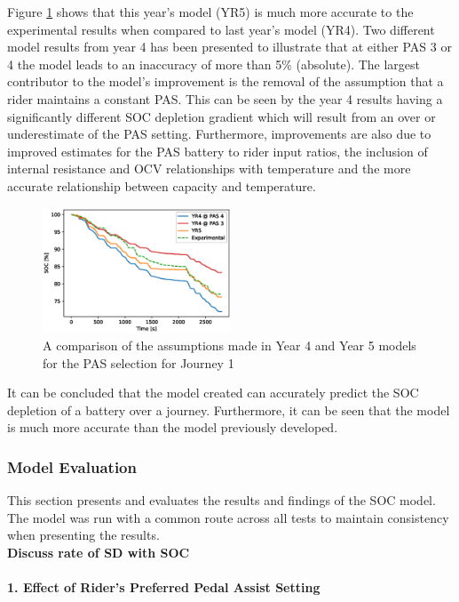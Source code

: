 \documentclass[a4paper, 10pt]{article}
\numberwithin{equation}{section}
\begin{document}
Figure \ref{fig:val_yr4_pas} shows that this year's model (YR5) is much more accurate to the experimental results when compared to last year's model (YR4). Two different model results from year 4 has been presented to illustrate that at either PAS 3 or 4 the model leads to an inaccuracy of more than 5\% (absolute). The largest contributor to the model's improvement is the removal of the assumption that a rider maintains a constant PAS. This can be seen by the year 4 results having a significantly different SOC depletion gradient which will result from an over or underestimate of the PAS setting. Furthermore, improvements are also due to improved estimates for the PAS battery to rider input ratios, the inclusion of internal resistance and OCV relationships with temperature and the more accurate relationship between capacity and temperature.

\begin{figure}[H]
    \centering
    \includegraphics[width=0.5\textwidth]{images/val_yr4_pas.eps}
    \caption{A comparison of the assumptions made in Year 4 and Year 5 models for the PAS selection for Journey 1}
    \label{fig:val_yr4_pas}
\end{figure}

It can be concluded that the model created can accurately predict the SOC depletion of a battery over a journey. Furthermore, it can be seen that the model is much more accurate than the model previously developed.

\subsubsection{Model Evaluation}

This section presents and evaluates the results and findings of the SOC model. The model was run with a common route across all tests to maintain consistency when presenting the results.
\\
\textbf{Discuss rate of SD with SOC}
\\
\\
\textbf{1. Effect of Rider's Preferred Pedal Assist Setting}
\end{document}
